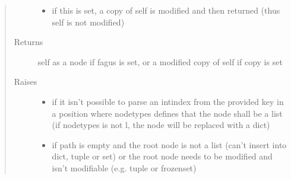 \documentclass[a4paper,10pt,english]{sphinxmanual}
\begin{document}
\begin{fulllineitems}
\begin{fulllineitems}
\begin{quote}
\begin{description}
\begin{itemize}
\item {}
\sphinxAtStartPar
{} \textendash{} if this is set, a copy of self is modified and then returned (thus self is not modified)

\end{itemize}

\item[{Returns}] \leavevmode
\sphinxAtStartPar
self as a node if fagus is set, or a modified copy of self if copy is set

\item[{Raises}] \leavevmode\begin{itemize}
\item {}
\sphinxAtStartPar
{} \textendash{} if it isn’t possible to parse an int\sphinxhyphen{}index from the provided key in a position where node\sphinxhyphen{}types
    defines that the node shall be a list (if node\sphinxhyphen{}types is not l, the node will be replaced with a dict)

\item {}
\sphinxAtStartPar
{} \textendash{} if path is empty and the root node is not a list (can’t insert into dict, tuple or set) or the
    root node needs to be modified and isn’t modifiable (e.g. tuple or frozenset)

\end{itemize}

\end{description}\end{quote}

\end{fulllineitems}



\end{fulllineitems}
\end{document}
